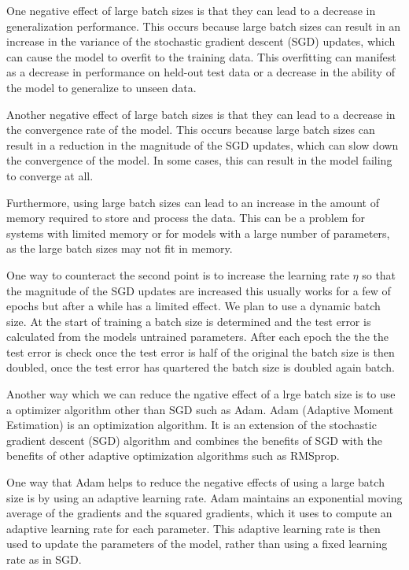 \documentclass[11pt]{article}
\begin{document}
One negative effect of large batch sizes is that they can lead to a decrease in generalization performance. This occurs because large batch sizes can result in an increase in the variance of the stochastic gradient descent (SGD) updates, which can cause the model to overfit to the training data. This overfitting can manifest as a decrease in performance on held-out test data or a decrease in the ability of the model to generalize to unseen data.

Another negative effect of large batch sizes is that they can lead to a decrease in the convergence rate of the model. This occurs because large batch sizes can result in a reduction in the magnitude of the SGD updates, which can slow down the convergence of the model. In some cases, this can result in the model failing to converge at all.

Furthermore, using large batch sizes can lead to an increase in the amount of memory required to store and process the data. This can be a problem for systems with limited memory or for models with a large number of parameters, as the large batch sizes may not fit in memory.

One way to counteract the second point is to increase the learning rate $\eta$ so that the magnitude of the SGD updates are increased this usually works for a few of epochs but after a while has a limited effect. We plan to use a dynamic batch size. At the start of training a batch size is determined and the test error is calculated from the models untrained parameters. After each epoch the the the test error is check once the test error is half of the original the batch size is then doubled, once the test error has quartered the batch size is doubled again batch.

Another way which we can reduce the ngative effect of a lrge batch size is to use a optimizer algorithm other than SGD such as Adam. Adam (Adaptive Moment Estimation) is an optimization algorithm. It is an extension of the stochastic gradient descent (SGD) algorithm and combines the benefits of SGD with the benefits of other adaptive optimization algorithms such as RMSprop. 

One way that Adam helps to reduce the negative effects of using a large batch size is by using an adaptive learning rate. Adam maintains an exponential moving average of the gradients and the squared gradients, which it uses to compute an adaptive learning rate for each parameter. This adaptive learning rate is then used to update the parameters of the model, rather than using a fixed learning rate as in SGD. 
\end{document}
